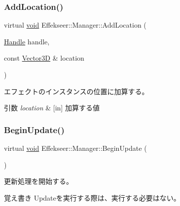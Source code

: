 \subsubsection{\texorpdfstring{Add\+Location()}{AddLocation()}}
{\footnotesize\ttfamily virtual \mbox{\hyperlink{namespace_effekseer_ab34c4088e512200cf4c2716f168deb56}{void}} Effekseer\+::\+Manager\+::\+Add\+Location (\begin{DoxyParamCaption}\item[{\mbox{\hyperlink{namespace_effekseer_afba58b8d812da862190e9bbfc040824a}{Handle}}}]{handle,  }\item[{const \mbox{\hyperlink{struct_effekseer_1_1_vector3_d}{Vector3D}} \&}]{location }\end{DoxyParamCaption})\hspace{0.3cm}{\ttfamily [pure virtual]}}



エフェクトのインスタンスの位置に加算する。 


\begin{DoxyParams}{引数}
{\em location} & \mbox{[}in\mbox{]} 加算する値 \\
\hline
\end{DoxyParams}
\mbox{\label{class_effekseer_1_1_manager_a8b9585b3bee11d4d0d7b29b742178f96}} 
\subsubsection{\texorpdfstring{Begin\+Update()}{BeginUpdate()}}
{\footnotesize\ttfamily virtual \mbox{\hyperlink{namespace_effekseer_ab34c4088e512200cf4c2716f168deb56}{void}} Effekseer\+::\+Manager\+::\+Begin\+Update (\begin{DoxyParamCaption}{ }\end{DoxyParamCaption})\hspace{0.3cm}{\ttfamily [pure virtual]}}



更新処理を開始する。 

\begin{DoxyNote}{覚え書き}
Updateを実行する際は、実行する必要はない。 
\end{DoxyNote}
\mbox{\label{class_effekseer_1_1_manager_a95c20ca6352c0e68a6fa1d271bcabc1f}} 
